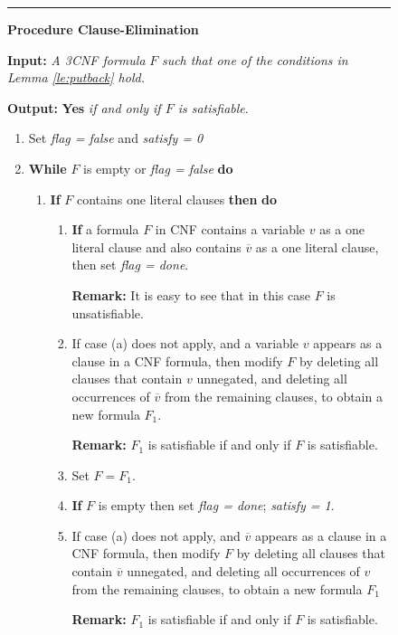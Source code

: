 \smallspacing
{\small
\begin{figure}[tbp]
\rule{\textwidth}{0.01in}

\noindent
{\bf Procedure Clause-Elimination} 

\noindent
{\bf Input:} {\it A 3CNF formula } $F$ {\em such that one of the conditions
in Lemma \ref{le:putback} hold.}

\noindent
{\bf Output:} {\bf Yes} {\em if and only if $F$ is satisfiable}.
\begin{enumerate}
\item
Set  {\em flag = false} and {\em satisfy = 0}
\item

{\bf While} $F$ is empty or {\em flag = false} {\bf do}

\begin{enumerate}
\item
{\bf If} $F$ contains one literal clauses {\bf then} {\bf do}
\begin{enumerate}
\item
{\bf If} a formula $F$ in {\sf CNF} 
contains a variable $v$ as a one literal clause and
also contains $\overline{v}$ as a one literal clause, 
then  set {\em flag = done}.

\noindent
{\bf Remark:} It is easy to see that in this case $F$ is unsatisfiable. 

\item 
If case (a) does not apply, and a variable $v$ appears as a clause in a 
{\sf CNF}
formula, then modify $F$ by deleting all clauses that contain $v$
unnegated, and deleting all occurrences of $\overline{v}$ from the remaining
clauses, to obtain a new formula $F_1$.

\noindent
{\bf Remark:} $F_1$ is satisfiable if and only if  $F$ is satisfiable. 

\item
Set $F = F_1$.

\item
{\bf If} $F$ is empty then set {\em flag = done}; {\em satisfy = 1}.

\item
If case (a) does not apply, and  $\overline{v}$ appears as a clause 
in a {\sf CNF}
formula, then modify $F$ by deleting all clauses that contain 
$\overline{v}$
unnegated, and deleting all occurrences of $v$ from the remaining
clauses, to obtain a new formula $F_1$ 

\noindent
{\bf Remark:} $F_1$ is satisfiable if and only if $F$ is satisfiable.


\end{enumerate}
\end{enumerate}
\end{enumerate}
\end{figure}}
